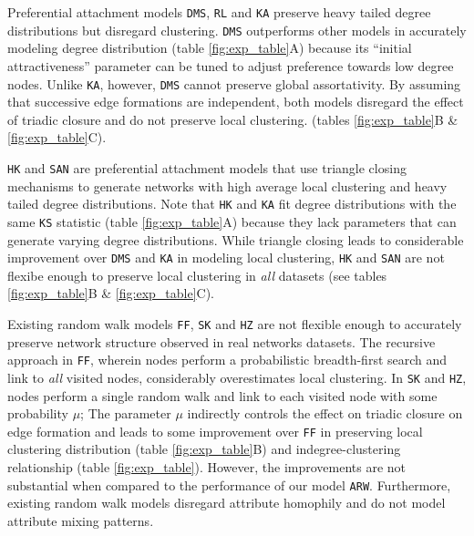 Preferential attachment models \texttt{DMS}, \texttt{RL}
and \texttt{KA} preserve heavy tailed degree distributions but disregard
clustering. \texttt{DMS} outperforms other models in accurately modeling
degree distribution (table \ref{fig:exp_table}A) because its ``initial attractiveness''
parameter can be tuned to adjust preference towards low degree nodes. Unlike \texttt{KA}, however,
\texttt{DMS} cannot preserve global assortativity.
By assuming that successive edge formations are independent, both models disregard
the effect of triadic closure and do not preserve local clustering. (tables \ref{fig:exp_table}B \& \ref{fig:exp_table}C).

\texttt{HK} and \texttt{SAN} are preferential attachment models
that use triangle closing mechanisms to generate networks with high average
local clustering and heavy tailed degree distributions.
Note that \texttt{HK} and \texttt{KA} fit degree distributions with the same \texttt{KS} statistic
(table \ref{fig:exp_table}A) because they lack parameters that can generate varying degree distributions.
While triangle closing leads to considerable improvement over \texttt{DMS}
and \texttt{KA} in modeling local clustering, \texttt{HK} and \texttt{SAN} are not flexibe enough
to preserve local clustering in \textit{all} datasets (see tables \ref{fig:exp_table}B \& \ref{fig:exp_table}C).

Existing random walk models \texttt{FF}, \texttt{SK} and \texttt{HZ}
are not flexible enough to accurately preserve network structure observed in real networks datasets.
The recursive approach in \texttt{FF}, wherein nodes perform a probabilistic breadth-first search
and link to \textit{all} visited nodes, considerably overestimates local clustering.
In \texttt{SK} and \texttt{HZ}, nodes perform a single random walk and link to
each visited node with some probability $\mu$; The parameter $\mu$ indirectly
controls the effect on triadic closure on edge formation
and leads to some improvement over \texttt{FF} in preserving local
clustering distribution (table \ref{fig:exp_table}B) and indegree-clustering relationship (table
\ref{fig:exp_table}). However, the improvements are not substantial when compared to the performance
of our model \texttt{ARW}. Furthermore, existing random walk models disregard attribute homophily
and do not model attribute mixing patterns.

